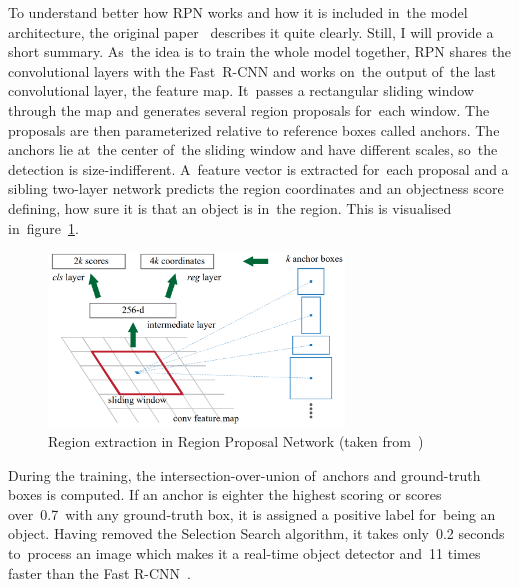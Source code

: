 To understand better how RPN works and how it is included in~the model architecture, the \hbox{original} paper~\cite{faster-rcnn} describes it quite clearly. Still, I will provide a short summary. As~the idea is to train the whole model together, RPN shares the convolutional layers with the \hbox{Fast R-CNN} and works on~the output of~the last convolutional layer, the feature map. It~passes a \hbox{rectangular} sliding window through the map and generates several region proposals for~each window. The proposals are then parameterized relative to reference boxes called anchors. The anchors lie at~the center of~the sliding window and have different scales, so~the detection is \hbox{size-indifferent}. A~feature vector is extracted for~each proposal and a sibling \hbox{two-layer} network predicts the region coordinates and an objectness score defining, how sure it is that an object is in~the region. This is visualised in~figure~\ref{algorithms-faster-rcnn-rpn}.

\begin{figure}[hbt]
    \centering
    \includegraphics[width=0.7\textwidth]{img/algorithms/faster-rcnn-rpn.png}
    \caption{Region extraction in Region Proposal Network (taken from~\cite{faster-rcnn})}
    \label{algorithms-faster-rcnn-rpn}
\end{figure}

During the training, the intersection-over-union of~anchors and \hbox{ground-truth} boxes is computed. If an anchor is eighter the highest scoring or scores over~0.7~with any \hbox{ground-truth} box, it is assigned a positive label for~being an object. Having removed the Selection Search algorithm, it takes only~0.2 seconds to~process an image which makes it a real-time object detector and~11 times faster than the Fast R-CNN~\cite{stanford-object-detection-lecture}.


